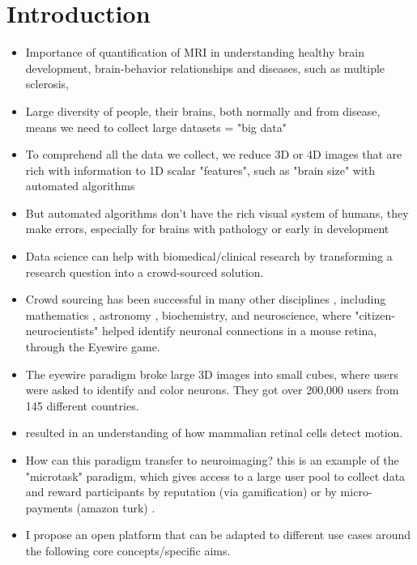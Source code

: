 \section{Introduction}
\begin{itemize}
\item Importance of quantification of MRI in understanding healthy brain development\cite{giedd1999brain}, brain-behavior relationships\cite{biswal2010toward} and diseases, such as multiple sclerosis\cite{bakshi2008mri}, 
\item Large diversity of people, their brains, both normally and from disease, means we need to collect large datasets = "big data"
\item To comprehend all the data we collect, we reduce 3D or 4D images that are rich with information to 1D scalar "features", such as "brain size" with automated algorithms
\item But automated algorithms don't have the rich visual system of humans, they make errors, especially for brains with pathology or early in development
\item Data science can help with biomedical/clinical research by transforming a research question into a crowd-sourced solution. 
\item Crowd sourcing has been successful in many other disciplines \cite{wiggins2011conservation}, including mathematics \cite{cranshaw2011polymath}, astronomy \cite{lintott2008galaxy}, biochemistry\cite{eiben2012increased}, and neuroscience\cite{kim2014space}, where "citizen-neurocientists" helped identify neuronal connections in a mouse retina, through the Eyewire game. 
\item The eyewire paradigm broke large 3D images into small cubes, where users were asked to identify and color neurons. They got over 200,000 users from 145 different countries.
\item resulted in an understanding of how mammalian retinal cells detect motion.
\item How can this paradigm transfer to neuroimaging? this is an example of the "microtask" paradigm, which gives access to a large user pool to collect data and reward participants by reputation (via gamification) or  by micro-payments (amazon turk) \cite{kittur2008crowdsourcing}.
\item I propose an open platform that can be adapted to different use cases around the following core concepts/specific aims.
\end{itemize}

